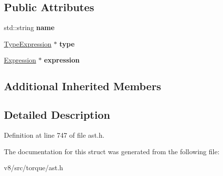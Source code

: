 \subsection*{Public Attributes}
\begin{DoxyCompactItemize}
\item 
\mbox{\label{structv8_1_1internal_1_1torque_1_1ConstDeclaration_a15b5d5a926fe2fd324f686a291bba17a}} 
std\+::string {\bfseries name}
\item 
\mbox{\label{structv8_1_1internal_1_1torque_1_1ConstDeclaration_a019e9d55eeb3c22c24704686dbf9ef51}} 
\mbox{\hyperlink{structv8_1_1internal_1_1torque_1_1TypeExpression}{Type\+Expression}} $\ast$ {\bfseries type}
\item 
\mbox{\label{structv8_1_1internal_1_1torque_1_1ConstDeclaration_a983e95e93bae03172aef062a12f5e5f8}} 
\mbox{\hyperlink{structv8_1_1internal_1_1torque_1_1Expression}{Expression}} $\ast$ {\bfseries expression}
\end{DoxyCompactItemize}
\subsection*{Additional Inherited Members}


\subsection{Detailed Description}


Definition at line 747 of file ast.\+h.



The documentation for this struct was generated from the following file\+:\begin{DoxyCompactItemize}
\item 
v8/src/torque/ast.\+h\end{DoxyCompactItemize}
